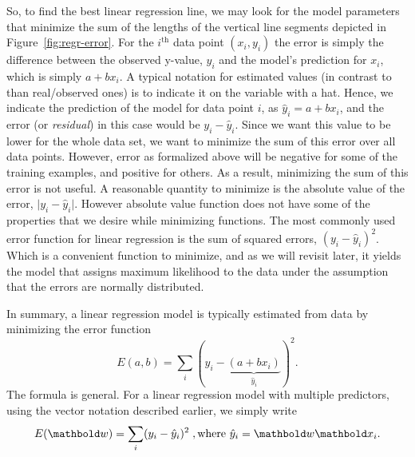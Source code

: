 So, to find the best linear regression line,
we may look for the model parameters that minimize the sum of the lengths
of the vertical line segments depicted in Figure~\ref{fig:regr-error}.
For the $i^\text{th}$ data point $(x_{i}, y_{i})$ the error is simply
the difference between the observed y-value, $y_{i}$
and the model's prediction for $x_{i}$, which is simply $a + b x_{i}$.
A typical notation for estimated values
(in contrast to than real/observed ones)
is to indicate it on the variable with a hat.
Hence, we indicate the prediction of the model for data point $i$,
as $\hat{y}_{i} = a + b x_{i}$,
and the error (or \emph{residual}) in this case would be $y_{i} - \hat{y}_{i}$.
Since we want this value to be lower for the whole data set,
we want to minimize the sum of this error over all data points.
However, error as formalized above will be negative
for some of the training examples, and positive for others.
As a result, minimizing the sum of this error is not useful.
A reasonable quantity to minimize is the absolute value of the error,
$\vert{}y_{i} - \hat{y}_{i}\vert$.
However absolute value function does not have some of the properties
that we desire while minimizing functions.
The most commonly used error function for linear regression is
the sum of squared errors, $(y_{i} - \hat{y}_{i})^{2}$.
Which is a convenient function to minimize,
and as we will revisit later,
it yields the model that assigns maximum likelihood to the data
under the assumption that the errors are normally distributed.

In summary, a linear regression model is typically estimated from data
by minimizing the error function 
\begin{equation}\label{eq:simple-regression-err}
  E(a,b) = \sum_{i} \left(y_{i} -
            \underbrace{(a + b x_{i})}_{\hat{y}_{i}}
        \right)^{2} .
\end{equation}
The formula is general.
For a linear regression model with multiple predictors,
using the vector notation described earlier,%
we simply write
\begin{equation}\label{eq:regression-err}
  E(\vect{w}) = \sum_{i} (y_{i} - \hat{y}_{i})^{2}\;,
  \text{where } \hat{y}_{i} = \vect{w}\vect{x}_{i} .
\end{equation}

